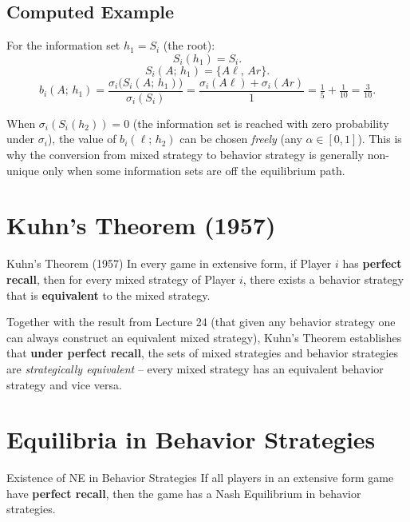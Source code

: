 \documentclass[12pt, a4paper]{article}
\begin{document}
\subsection{Computed Example}

For the information set $h_1 = S_i$ (the root):
\[
  S_i(h_1) = S_i.
\]
\[
  S_i(A;\,h_1) = \{A\ell,\, Ar\}.
\]
\[
  b_i(A;\,h_1)
  = \frac{\sigma_i\!\bigl(S_i(A;\,h_1)\bigr)}{\sigma_i(S_i)}
  = \frac{\sigma_i(A\ell) + \sigma_i(Ar)}{1}
  = \tfrac{1}{5} + \tfrac{1}{10} = \tfrac{3}{10}.
\]

\begin{notebox}
  When $\sigma_i(S_i(h_2)) = 0$ (the information set is reached with zero probability under $\sigma_i$), the value of $b_i(\ell;\,h_2)$ can be chosen \emph{freely} (any $\alpha \in [0,1]$). This is why the conversion from mixed strategy to behavior strategy is generally non-unique only when some information sets are off the equilibrium path.
\end{notebox}

\section{Kuhn's Theorem (1957)}

\begin{thmbox}{Kuhn's Theorem (1957)}
  In every game in extensive form, if Player $i$ has \textbf{perfect recall}, then for every mixed strategy of Player $i$, there exists a behavior strategy that is \textbf{equivalent} to the mixed strategy.
\end{thmbox}

\begin{notebox}
  Together with the result from Lecture 24 (that given any behavior strategy one can always construct an equivalent mixed strategy), Kuhn's Theorem establishes that \textbf{under perfect recall}, the sets of mixed strategies and behavior strategies are \emph{strategically equivalent} -- every mixed strategy has an equivalent behavior strategy and vice versa.
\end{notebox}

\section{Equilibria in Behavior Strategies}

\begin{thmbox}{Existence of NE in Behavior Strategies}
  If all players in an extensive form game have \textbf{perfect recall}, then the game has a Nash Equilibrium in behavior strategies.
\end{thmbox}
\end{document}
